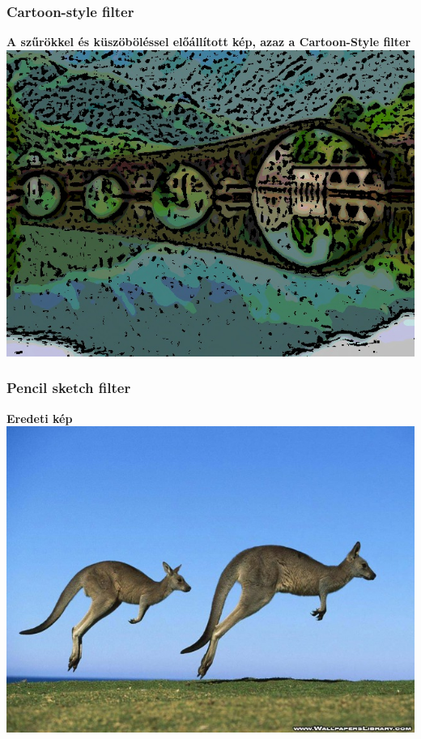 \documentclass{beamer}
\begin{document}
\begin{frame}[fragile]
\frametitle{Cartoon-style filter}
\begin{center}
\textbf{A szűrökkel és küszöböléssel előállított kép, azaz a Cartoon-Style filter}
\includegraphics[scale=0.42]{kepek/cartoon_style/Cartoon_filter.jpg}
\end{center}
\end{frame}

\begin{frame}[fragile]
\frametitle{Pencil sketch filter}
\begin{center}
\textbf{Eredeti kép}
\includegraphics[scale=0.42]{kepek/pencil_sketch/image.jpg}
\end{center}
\end{frame}
\end{document}
